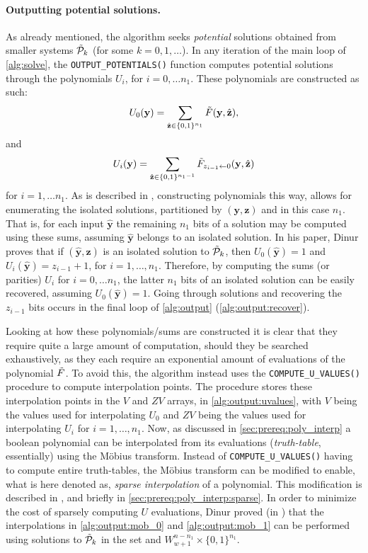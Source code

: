 \paragraph{Outputting potential solutions.} As already mentioned, the algorithm seeks \textit{potential} solutions obtained from smaller systems $\Tilde{\mathcal{P}}_k$ (for some $k = 0, 1,\dots $). In any iteration of the main loop of \cref{alg:solve}, the \texttt{OUTPUT\_POTENTIALS()} function computes potential solutions through the polynomials $U_i$, for $i = 0, \dots n_1$. These polynomials are constructed as such: 
$$
U_0(\mathbf{y}) = \sum_{\hat{\mathbf{z}} \in \{0,1\}^{n_1}} \Tilde{F}(\mathbf{y}, \hat{\mathbf{z}}),
$$
and
$$
U_i(\mathbf{y}) = \sum_{\hat{\mathbf{z}} \in \{0,1\}^{n_1 - 1}} \Tilde{F}_{z_{i - 1} \leftarrow 0}(\mathbf{y}, \hat{\mathbf{z}})
$$
for $i = 1, \dots n_1$. As is described in \cite{eurocrypt-2021-30841}, constructing polynomials this way, allows for enumerating the isolated solutions, partitioned by $(\mathbf{y},\mathbf{z})$ and in this case $n_1$. That is, for each input $\hat{\mathbf{y}}$ the remaining $n_1$ bits of a solution may be computed using these sums, assuming $\hat{\mathbf{y}}$ belongs to an isolated solution. In his paper, Dinur proves that if $(\hat{\mathbf{y}}, \hat{\mathbf{z}})$ is an isolated solution to $\Tilde{\mathcal{P}}_k$, then $U_0(\hat{\mathbf{y}}) = 1$ and $U_i(\hat{\mathbf{y}}) = z_{i - 1} + 1$, for $i = 1, \dots, n_1$. Therefore, by computing the sums (or parities) $U_i$ for $i = 0, \dots n_1$, the latter $n_1$ bits of an isolated solution can be easily recovered, assuming $U_0(\hat{\mathbf{y}}) = 1$. Going through solutions and recovering the $z_{i - 1}$ bits occurs in the final loop of \cref{alg:output} (\cref{alg:output:recover}).

Looking at how these polynomials/sums are constructed it is clear that they require quite a large amount of computation, should they be searched exhaustively, as they each require an exponential amount of evaluations of the polynomial $\Tilde{F}$. To avoid this, the algorithm instead uses the \texttt{COMPUTE\_U\_VALUES()} procedure to compute interpolation points. The procedure stores these interpolation points in the $V$ and $ZV$ arrays, in \cref{alg:output:uvalues}, with $V$ being the values used for interpolating $U_0$ and $ZV$ being the values used for interpolating $U_i$ for $i = 1, \dots, n_1$. Now, as discussed in \cref{sec:prereq:poly_interp} a boolean polynomial can be interpolated from its evaluations (\textit{truth-table}, essentially) using the Möbius transform. Instead of \texttt{COMPUTE\_U\_VALUES()} having to compute entire truth-tables, the Möbius transform can be modified to enable, what is here denoted as, \textit{sparse interpolation} of a polynomial. This modification is described in \cite{fse-2011-23547}, and briefly in \cref{sec:prereq:poly_interp:sparse}. In order to minimize the cost of sparsely computing $U$ evaluations, Dinur proved (in \cite{eurocrypt-2021-30841}) that the interpolations in \cref{alg:output:mob_0} and \cref{alg:output:mob_1} can be performed using solutions to $\Tilde{\mathcal{P}}_k$ in the set and $W^{n - n_1}_{w + 1} \times \{0, 1\}^{n_1}$.

